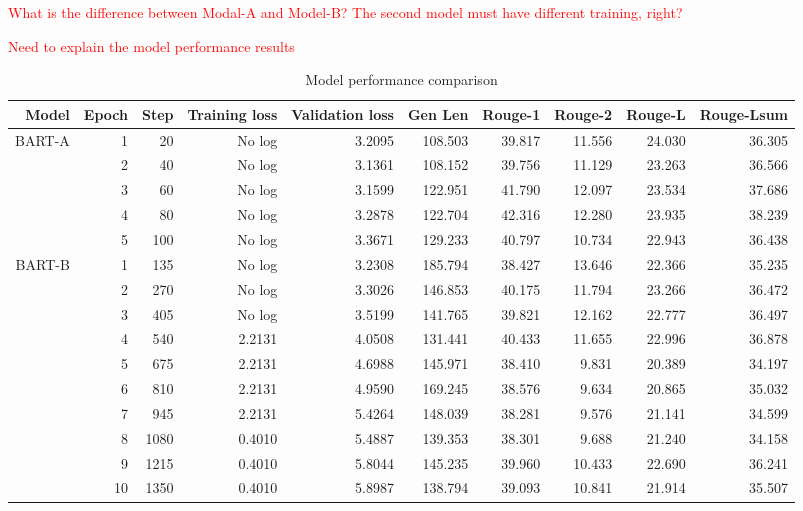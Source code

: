 \textcolor{red}{What is the difference between Modal-A and Model-B? The second model must have different training, right?}

\textcolor{red}{Need to explain the model performance results}



\begin{table*}[h]
	\caption{Model performance comparison}
	\label{tab:hyperparam}
	\begin{center}
			\begin{tabular}{r|r|r|r|r|r|r|r|r|r}
			\hline
			Model & Epoch & Step & Training loss  & Validation loss & Gen Len & Rouge-1 & Rouge-2 & Rouge-L & Rouge-Lsum \\
			\hline
			BART-A & 1 & 20 & No log & 3.2095 & 108.503 & 39.817 & 11.556 & 24.030 & 36.305 \\
			\cline{2-10}
			& 2 & 40 & No log & 3.1361 & 108.152 & 39.756 & 11.129 & 23.263 & 36.566 \\
			\cline{2-10}
			& 3 & 60 & No log & 3.1599 & 122.951 &  41.790 & 12.097 & 23.534 & 37.686 \\
			\cline{2-10}
			& 4 & 80 & No log  & 3.2878 & 122.704 & 42.316 & 12.280 & 23.935 & 38.239 \\
			\cline{2-10}
			& 5 & 100 & No log & 3.3671 & 129.233 & 40.797 & 10.734 & 22.943 & 36.438 \\ 
			\hline
			\hline
				BART-B & 1 & 135 & No log & 3.2308 & 185.794 & 38.427 & 13.646 & 22.366 & 35.235 \\
		\cline{2-10}
		& 2 & 270  & No log & 3.3026 & 146.853 & 40.175 & 11.794 & 23.266 & 36.472 \\
		\cline{2-10}
		& 3 & 405  & No log & 3.5199 & 141.765 & 39.821 & 12.162 & 22.777 & 36.497 \\
		\cline{2-10}
		& 4 & 540  &  2.2131 & 4.0508 & 131.441 & 40.433 & 11.655 & 22.996 & 36.878 \\
		\cline{2-10}
		& 5 & 675  &  2.2131 & 4.6988 & 145.971 & 38.410 & 9.831 & 20.389 & 34.197 \\
		\cline{2-10}
		& 6& 810  &  2.2131 & 4.9590 & 169.245 & 38.576 & 9.634 & 20.865 & 35.032 \\
		\cline{2-10}
		& 7 & 945 & 2.2131 & 5.4264 & 148.039 & 38.281 & 9.576 & 21.141 & 34.599 \\
		\cline{2-10}
		& 8 & 1080 & 0.4010 & 5.4887 & 139.353 & 38.301 & 9.688 & 21.240 & 34.158 \\
		\cline{2-10}
		& 9 & 1215 & 0.4010 & 5.8044 & 145.235 & 39.960 & 10.433 & 22.690 & 36.241 \\
		\cline{2-10}
		&10 & 1350 & 0.4010 & 5.8987 & 138.794 & 39.093 & 10.841 & 21.914 & 35.507 \\
			\hline
		\end{tabular}
	\end{center}
\end{table*}



